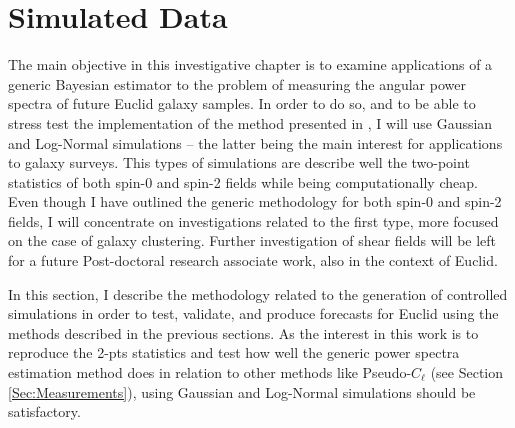 
\section{Simulated Data}\label{Sec:BPL:SimData}
The main objective in this investigative chapter is to examine applications of a generic Bayesian estimator to the problem of measuring the angular power spectra of future Euclid galaxy samples. In order to do so, and to be able to stress test the implementation of the method presented in \cite{SreeThesis}, I will use Gaussian and Log-Normal simulations -- the latter being the main interest for applications to galaxy surveys. This types of simulations are describe well the two-point statistics of both spin-0 and spin-2 fields while being computationally cheap. Even though I have outlined the generic methodology for both spin-0 and spin-2 fields, I will concentrate on investigations related to the first type, more focused on the case of galaxy clustering. Further investigation of shear fields will be left for a future Post-doctoral research associate work, also in the context of Euclid.

\qquad In this section, I describe the methodology related to the generation of controlled simulations in order to test, validate, and produce forecasts for Euclid using the methods described in the previous sections.  As the interest in this work is to reproduce the 2-pts statistics and test how well the generic power spectra estimation method does in relation to other methods like Pseudo-$C_{\ell}$ (see Section \ref{Sec:Measurements}), using Gaussian and Log-Normal simulations should be satisfactory.

